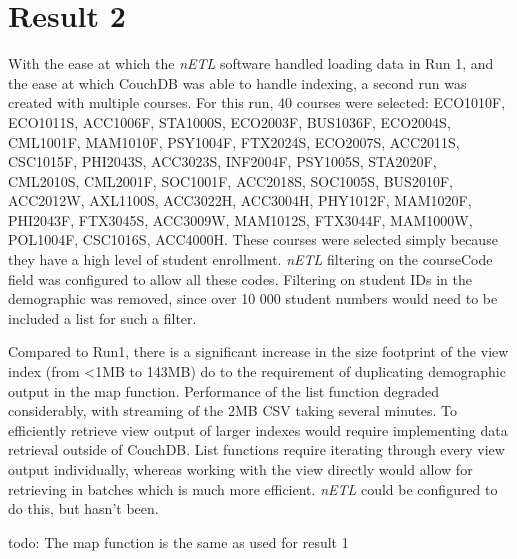\section{Result 2}
With the ease at which the \textit{nETL} software handled loading data in Run 1, and the ease at which CouchDB was able to handle indexing, a second run was created with multiple courses. For this run, 40 courses were selected: ECO1010F, ECO1011S, ACC1006F, STA1000S, ECO2003F, BUS1036F, ECO2004S, CML1001F, MAM1010F, PSY1004F, FTX2024S, ECO2007S, ACC2011S, CSC1015F, PHI2043S, ACC3023S, INF2004F, PSY1005S, STA2020F, CML2010S, CML2001F, SOC1001F, ACC2018S, SOC1005S, BUS2010F, ACC2012W, AXL1100S, ACC3022H, ACC3004H, PHY1012F, MAM1020F, PHI2043F, FTX3045S, ACC3009W, MAM1012S, FTX3044F, MAM1000W, POL1004F, CSC1016S, ACC4000H. These courses were selected simply because they have a high level of student enrollment. \textit{nETL} filtering on the courseCode field was configured to allow all these codes. Filtering on student IDs in the demographic was removed, since over 10 000 student numbers would need to be included a list for such a filter.

Compared to Run1, there is a significant increase in the size footprint of the view index (from \textless 1MB to 143MB) do to the requirement of duplicating demographic output in the map function. Performance of the list function degraded considerably, with streaming of the 2MB CSV taking several minutes. To efficiently retrieve view output of larger indexes would require implementing data retrieval outside of CouchDB. List functions require iterating through every view output individually, whereas working with the view directly would allow for retrieving in batches which is much more efficient. \textit{nETL} could be configured to do this, but hasn't been.

todo: The map function is the same as used for result 1

